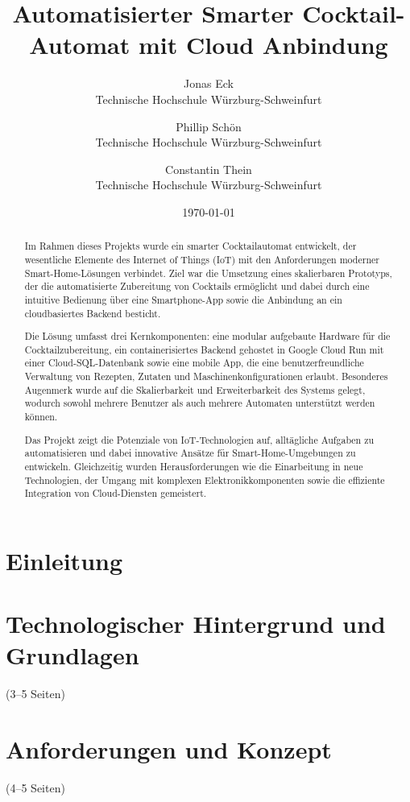 \documentclass[a4paper, 12pt]{IEEEconf} %
\title{Automatisierter Smarter Cocktail-Automat mit Cloud Anbindung}
\author{ 
  Jonas Eck \\
	Technische Hochschule Würzburg-Schweinfurt\\
	\and 
	Phillip Schön \\
	Technische Hochschule Würzburg-Schweinfurt\\
	\and 
  Constantin Thein\\
	Technische Hochschule Würzburg-Schweinfurt\\
	}
\date{\today}
\begin{document}
\maketitle
\newpage
\tableofcontents
\newpage

\begin{abstract}
Im Rahmen dieses Projekts wurde ein smarter Cocktailautomat entwickelt, der wesentliche Elemente des
Internet of Things (IoT) mit den Anforderungen moderner Smart-Home-Lösungen verbindet. Ziel war die
Umsetzung eines skalierbaren Prototyps, der die automatisierte Zubereitung von Cocktails ermöglicht 
und dabei durch eine intuitive Bedienung über eine Smartphone-App sowie die Anbindung an ein 
cloudbasiertes Backend besticht.

Die Lösung umfasst drei Kernkomponenten: eine modular aufgebaute Hardware für die 
Cocktailzubereitung, ein containerisiertes Backend gehostet in Google Cloud Run mit einer 
Cloud-SQL-Datenbank sowie eine mobile App, die eine benutzerfreundliche Verwaltung von Rezepten, 
Zutaten und Maschinenkonfigurationen erlaubt. Besonderes Augenmerk wurde auf die Skalierbarkeit und 
Erweiterbarkeit des Systems gelegt, wodurch sowohl mehrere Benutzer als auch mehrere Automaten 
unterstützt werden können.

Das Projekt zeigt die Potenziale von IoT-Technologien auf, alltägliche Aufgaben zu automatisieren 
und dabei innovative Ansätze für Smart-Home-Umgebungen zu entwickeln. Gleichzeitig wurden 
Herausforderungen wie die Einarbeitung in neue Technologien, der Umgang mit komplexen 
Elektronikkomponenten sowie die effiziente Integration von Cloud-Diensten gemeistert.
\end{abstract}
\newpage

\section{Einleitung}
    
\newpage

\section{Technologischer Hintergrund und Grundlagen}(3–5 Seiten)
    
\newpage

\section{Anforderungen und Konzept}(4–5 Seiten)
    
\newpage
\end{document}

